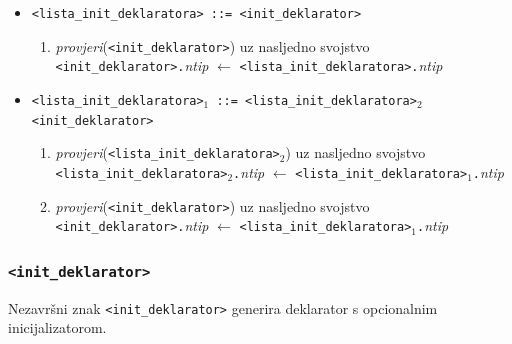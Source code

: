 \documentclass[times, 12pt, utf8]{book}
\begin{document}
\begin{itemize}

\item
\verb|<lista_init_deklaratora> ::= <init_deklarator>|
\begin{enumerate}
\item
\emph{provjeri}(\verb|<init_deklarator>|) uz nasljedno svojstvo\\
\verb|<init_deklarator>.|\emph{ntip} \(\leftarrow\) \verb|<lista_init_deklaratora>.|\emph{ntip}
\end{enumerate}

\item
\verb|<lista_init_deklaratora>|\(_1\)\verb| ::= <lista_init_deklaratora>|\(_2\)\verb| <init_deklarator>|
\begin{enumerate}
\item
\emph{provjeri}(\verb|<lista_init_deklaratora>|\(_2\)) uz nasljedno svojstvo\\
\verb|<lista_init_deklaratora>|\(_2\)\verb|.|\emph{ntip} \(\leftarrow\) \verb|<lista_init_deklaratora>|\(_1\)\verb|.|\emph{ntip}
\item
\emph{provjeri}(\verb|<init_deklarator>|) uz nasljedno svojstvo\\
\verb|<init_deklarator>.|\emph{ntip} \(\leftarrow\) \verb|<lista_init_deklaratora>|\(_1\)\verb|.|\emph{ntip}
\end{enumerate}

\end{itemize}


\subsubsection{\texttt{<init\_deklarator>}}

Nezavršni znak \verb|<init_deklarator>| generira deklarator s opcionalnim inicijalizatorom.
\end{document}
